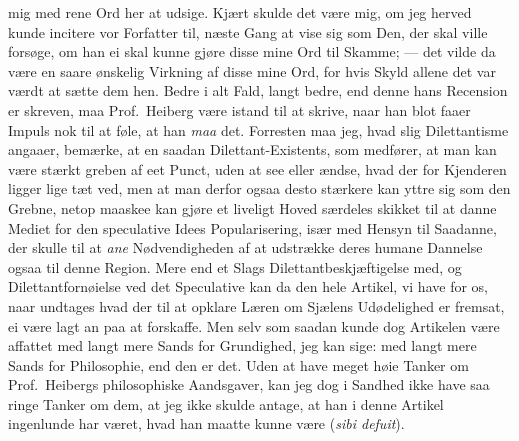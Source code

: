 \documentclass[12pt,a4paper]{book}
\newcommand{\apage}[1]{\marginnote{\footnotesize\textit{[#1]}}}
\begin{document}
\apage{9} mig med rene Ord her at udsige. Kjært skulde det være mig, om jeg herved
kunde incitere vor Forfatter til, næste Gang at vise sig som Den, der skal
ville forsøge, om han ei skal kunne gjøre disse mine Ord til Skamme; ---
det vilde da være en saare ønskelig Virkning af disse mine Ord, for hvis
Skyld allene det var værdt at sætte dem hen. Bedre i alt Fald, langt bedre,
end denne hans Recension er skreven, maa Prof.\ Heiberg være istand til at
skrive, naar han blot faaer Impuls nok til at føle, at han \emph{maa} det.
Forresten maa jeg, hvad slig Dilettantisme angaaer, bemærke, at en saadan
Dilettant-Existents, som medfører, at man kan være stærkt greben af eet
Punct, uden at see eller ændse, hvad der for Kjenderen ligger lige tæt ved,
men at man derfor ogsaa desto stærkere kan yttre sig som den Grebne, netop
maaskee kan gjøre et liveligt Hoved særdeles skikket til at danne Mediet
for den speculative Idees Popularisering, især med Hensyn til Saadanne, der
skulle til at \emph{ane} Nødvendigheden af at udstrække deres humane Dannelse
ogsaa til denne Region. Mere end et Slags Dilettantbeskjæftigelse med, og
Dilettantfornøielse ved det Speculative kan da den hele Artikel, vi have
for os, naar undtages hvad der til at opklare Læren om Sjælens Udødelighed
er fremsat, ei være lagt an paa at forskaffe. Men selv som saadan kunde dog
Artikelen være affattet med langt mere Sands for Grundighed, jeg kan sige:
med langt mere Sands for Philosophie, end den er det. Uden at have meget
høie Tanker om Prof.\ Heibergs philosophiske Aandsgaver, kan jeg dog i
Sandhed ikke have saa ringe Tanker om dem, at jeg ikke skulde antage, at
han i denne Artikel ingenlunde har været, hvad han maatte kunne være
(\textit{sibi defuit}).
\end{document}
